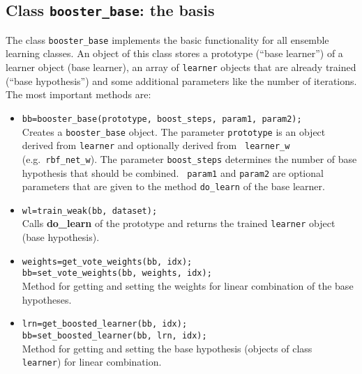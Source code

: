 \documentclass{article}
\begin{document}
\subsection{Class {\tt booster\_base}: the basis}
The class {\tt booster\_base} implements the basic functionality for all
ensemble learning classes. An object of this class stores a prototype (``base
learner'') of a learner object (base learner), an array of {\tt learner}
objects that are already trained (``base hypothesis'') and some additional
parameters like the number of iterations. The most important methods are:
\begin{itemize}
\item {\tt bb=booster\_base(prototype, boost\_steps, param1, param2);}\\
  Creates a {\tt booster\_base} object. The parameter {\tt prototype} is an
  object derived from {\tt learner} and optionally derived from {\tt
    learner\_w} (e.g.~{\tt rbf\_net\_w}). The parameter {\tt boost\_steps}
  determines the number of base hypothesis that should be combined. {\tt
    param1} and {\tt param2} are optional parameters that are given to the
  method {\tt do\_learn} of the base learner.
\item  {\tt wl=train\_weak(bb, dataset);}\\
  Calls {\bf do\_learn} of the prototype and returns the trained {\tt learner}
  object (base hypothesis).
\item {\tt weights=get\_vote\_weights(bb, idx);\\
    bb=set\_vote\_weights(bb, weights, idx);} \\
  Method for getting and setting the weights for linear combination of the
  base hypotheses.
\item {\tt lrn=get\_boosted\_learner(bb, idx);\\
    bb=set\_boosted\_learner(bb, lrn, idx);}\\
  Method for getting and setting the base hypothesis (objects of class {\tt
    learner}) for linear combination.
\end{itemize}
\end{document}
